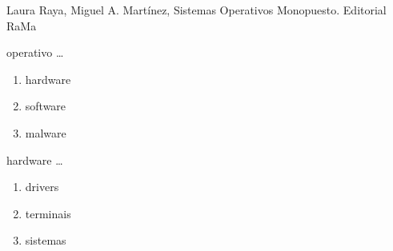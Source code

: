 \clearpage
\begin{thebibliography}{1}
	Laura Raya, Miguel A. Martínez, Sistemas Operativos Monopuesto. Editorial RaMa
\end{thebibliography}
\tableofcontents






%
%
%
%
%
\begin{diapo} \begin{frame}{ operativo   \dots} 
\begin{enumerate}
	\item hardware\pause
	\item software \pause
	\item malware 
\end{enumerate} \end{frame}  \end{diapo}  
\begin{diapo}\begin{frame}{ hardware   \dots}
\begin{enumerate}
	\item drivers \pause
	\item terminais \pause
	\item sistemas 
\end{enumerate} \end{frame} \end{diapo}

